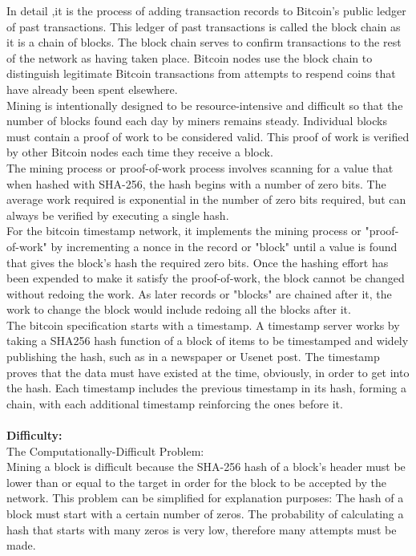 \documentclass[a4paper,11pt]{article}
\begin{document}
In detail ,it is the process of adding transaction records to Bitcoin's public ledger of past transactions. This ledger of past transactions is called the block chain as it is a chain of blocks. The block chain serves to confirm transactions to the rest of the network as having taken place. Bitcoin nodes use the block chain to distinguish legitimate Bitcoin transactions from attempts to respend coins that have already been spent elsewhere.\\
Mining is intentionally designed to be resource-intensive and difficult so that the number of blocks found each day by miners remains steady. Individual blocks must contain a proof of work to be considered valid. This proof of work is verified by other Bitcoin nodes each time they receive a block.\\
The mining process or proof-of-work process involves scanning for a value that when hashed with SHA-256, the hash begins with a number of zero bits. The average work required is exponential in the number of zero bits required, but can always be verified by executing a single hash.\\
For the bitcoin timestamp network, it implements the mining process or "proof-of-work" by incrementing a nonce in the record or "block" until a value is found that gives the block's hash the required zero bits. Once the hashing effort has been expended to make it satisfy the proof-of-work, the block cannot be changed without redoing the work. As later records or "blocks" are chained after it, the work to change the block would include redoing all the blocks after it.\\
The bitcoin specification starts with a timestamp. A timestamp server works by taking a SHA256 hash function of a block of items to be timestamped and widely publishing the hash, such as in a newspaper or Usenet post. The timestamp proves that the data must have existed at the time, obviously, in order to get into the hash. Each timestamp includes the previous timestamp in its hash, forming a chain, with each additional timestamp reinforcing the ones before it.\\\\
\textbf{Difficulty:}\\
The Computationally-Difficult Problem: \\
Mining a block is difficult because the SHA-256 hash of a block's header must be lower than or equal to the target in order for the block to be accepted by the network. This problem can be simplified for explanation purposes: The hash of a block must start with a certain number of zeros. The probability of calculating a hash that starts with many zeros is very low, therefore many attempts must be made.\\\\
\end{document}
